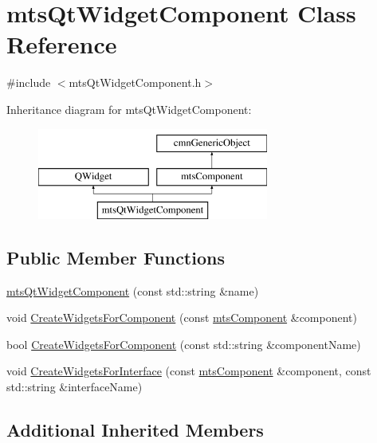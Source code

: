 \hypertarget{classmts_qt_widget_component}{\section{mts\-Qt\-Widget\-Component Class Reference}
\label{classmts_qt_widget_component}
}


{\ttfamily \#include $<$mts\-Qt\-Widget\-Component.\-h$>$}

Inheritance diagram for mts\-Qt\-Widget\-Component\-:\begin{figure}[H]
\begin{center}
\leavevmode
\includegraphics[height=3.000000cm]{d2/dab/classmts_qt_widget_component}
\end{center}
\end{figure}
\subsection*{Public Member Functions}
\begin{DoxyCompactItemize}
\item 
\hyperlink{classmts_qt_widget_component_afe2a54ffefa02341c29f013b0b0b3750}{mts\-Qt\-Widget\-Component} (const std\-::string \&name)
\item 
void \hyperlink{classmts_qt_widget_component_a56fc65ef0451e13c2e0dced7430a5787}{Create\-Widgets\-For\-Component} (const \hyperlink{classmts_component}{mts\-Component} \&component)
\item 
bool \hyperlink{classmts_qt_widget_component_ae30e192e6b48e59466bffb03c0179510}{Create\-Widgets\-For\-Component} (const std\-::string \&component\-Name)
\item 
void \hyperlink{classmts_qt_widget_component_a09c5772d7fb011fa41179390b3b3de7e}{Create\-Widgets\-For\-Interface} (const \hyperlink{classmts_component}{mts\-Component} \&component, const std\-::string \&interface\-Name)
\end{DoxyCompactItemize}
\subsection*{Additional Inherited Members}


